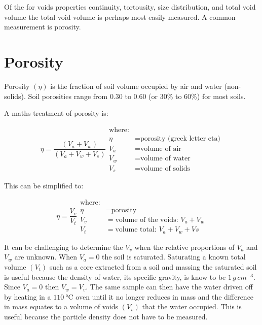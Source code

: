 \documentclass[a5paper]{book}
\begin{document}
Of the for voids properties continuity, tortousity, size distribution, and total void volume the total void volume is perhaps most easily measured. A common measurement is porosity.  

\section{Porosity}

Porosity $\left(\eta\right)$ is the fraction of soil volume occupied by air and water (non-solids). Soil porosities range from 0.30 to 0.60 (or 30\% to 60\%) for most soils.

A maths treatment of porosity is:

\begin{equation}
    \eta = \frac{\left(V_a + V_w\right)}{\left(V_a + V_w + V_s\right)}
    \begin{aligned}
        \text{where:}\\
        \eta &= \text{porosity (greek letter eta)}\\
        V_a &= \text{volume of air}\\
        V_w &= \text{volume of water}\\
        V_s &= \text{volume of solids}
    \end{aligned}
\end{equation}

This can be simplified to:

\begin{equation}
    \eta = \frac{V_v}{V_t}
    \begin{aligned}
        \text{where:}\\
        \eta &= \text{porosity}\\
        V_v &= \text{volume of the voids}:\,V_a+V_w\\
        V_t &= \text{volume total}:\,V_a+V_w+Vs
    \end{aligned}
\end{equation}

It can be challenging to determine the $V_v$ when the relative proportions of $V_a$ and $V_w$ are unknown. When $V_a = 0$ the soil is saturated. Saturating a known total volume $\left(V_t\right)$  such as a core extracted from a soil and massing the saturated soil is useful because the density of water, its specific gravity, is know to be $1\,g\,cm^{-3}$. Since $V_a=0$ then $V_w=V_v$. The same sample can then have the water driven off by heating in a $\SI{110}{\degreeCelsius}$ oven until it no longer reduces in mass and the difference in mass equates to a volume of voids $\left(V_v\right)$ that the water occupied. This is useful because the particle density does not have to be measured.
\end{document}
